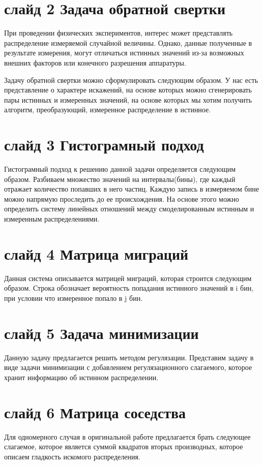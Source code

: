 \documentclass[a4paper,12pt]{diplom}
\begin{document}
\section*{слайд 2  Задача обратной свертки}
При проведении физических экспериментов, интерес может представлять распределение измеряемой случайной величины. Однако, данные 
полученные в результате измерения, могут отличаться  истинных значений из-за возможных внешних факторов или конечного разрешения 
аппаратуры.

Задачу обратной свертки можно сформулировать следующим образом. У нас есть представление о характере искажений, на основе которых 
можно сгенерировать пары истинных и измеренных значений, на основе которых мы хотим получить алгоритм, преобразующий, измеренное 
распределение в истинное.

\section*{слайд 3 Гистограмный подход}
Гистограмный подход к решению данной задачи определяется следующим образом. Разбиваем множество значений на интервалы(бины), где 
каждый отражает количество попавших в него частиц. Каждую запись в измеряемом бине можно напрямую проследить до ее происхождения. 
На основе этого можно определить систему линейных отношений между смоделированным истинным и измеренным распределениями.

\section*{слайд 4 Матрица миграций}
Данная система описывается матрицей миграций, которая строится следующим образом. Строка обозначает вероятность попадания истинного 
значений в i бин, при условии что измеренное попало в j бин.


\section*{слайд 5 Задача минимизации}

Данную задачу предлагается решить методом регулязации. Представим задачу в виде задачи минимизации с добавлением регулязационного 
слагаемого, которое хранит информацию об истинном распределении.

\section*{слайд 6 Матрица соседства}
Для одномерного случая в оригинальной работе предлагается брать следующее слагаемое, которое является суммой квадратов вторых 
производных, которое описаем гладкость искомого распределения.
\end{document}
